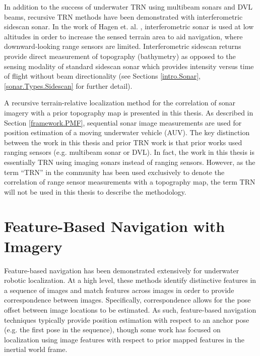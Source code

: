 In addition to the success of underwater TRN using multibeam sonars and DVL beams, recursive TRN methods have been demonstrated with interferometric sidescan sonar. 
In the work of Hagen et. al. \cite{Hagen2011}, interferometric sonar is used at low altitudes in order to increase the sensed terrain area to aid navigation, where downward-looking range sensors are limited.
Interferometric sidescan returns provide direct measurement of topography (bathymetry) as opposed to the sensing modality of standard sidescan sonar which provides intensity versus time of flight without beam directionality (see Sections \ref{intro.Sonar}, \ref{sonar.Types.Sidescan} for further detail). 

A recursive terrain-relative localization method for the correlation of sonar imagery with a prior topography map is presented in this thesis.
As described in Section \ref{framework.PMF}, sequential sonar image measurements are used for position estimation of a moving underwater vehicle (AUV).
The key distinction between the work in this thesis and prior TRN work is that prior works used ranging sensors (e.g. multibeam sonar or DVL).
In fact, the work in this thesis is essentially TRN using imaging sonars instead of ranging sensors.
However, as the term ``TRN'' in the community has been used exclusively to denote the correlation of range sensor measurements with a topography map, the term TRN will not be used in this thesis to describe the methodology.

\section{Feature-Based Navigation with Imagery}
\label{related.Feature}

Feature-based navigation has been demonstrated extensively for underwater robotic localization.
At a high level, these methods identify distinctive features in a sequence of images and match features across images in order to provide correspondence between images.
Specifically, correspondence allows for the pose offset between image locations to be estimated.
As such, feature-based navigation techniques typically provide position estimation with respect to an anchor pose (e.g. the first pose in the sequence), though some work has focused on localization using image features with respect to prior mapped features in the inertial world frame. 

